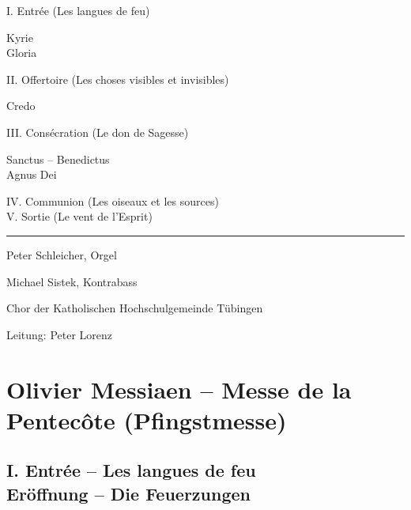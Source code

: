 \documentclass[a5paper,twoside,fontsize=10pt]{scrartcl}
\title{}
\author{}
\newcommand{\frenchandgermantitle}[2]{\subsection*{#1 \\#2}}
\begin{document}
            

\cleardoublepage

\begin{samepage}

I. Entrée (Les langues de feu)

Kyrie \\
Gloria

II. Offertoire (Les choses visibles et invisibles)

Credo

III. Consécration (Le don de Sagesse)

Sanctus -- Benedictus\\
Agnus Dei

IV. Communion (Les oiseaux et les sources) \\
V. Sortie (Le vent de l’Esprit)

\vfill

\par\noindent\rule{\textwidth}{0.4pt}

\begin{flushright}
Peter Schleicher, Orgel

Michael Sistek, Kontrabass

Chor der Katholischen Hochschulgemeinde Tübingen

Leitung: Peter Lorenz

\end{flushright}

\end{samepage}

\pagebreak

\section*{Olivier Messiaen – Messe de la Pentecôte (Pfingstmesse)}
\frenchandgermantitle{I. Entrée – Les langues de feu}{Eröffnung – Die Feuerzungen}
\end{document}
